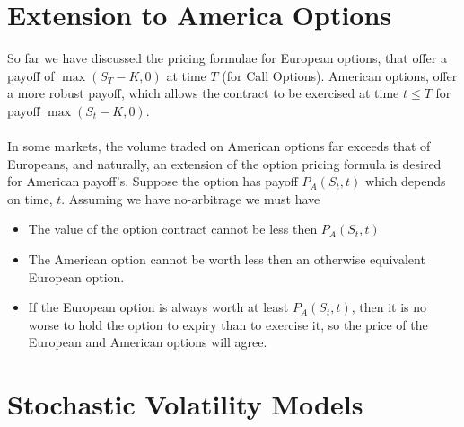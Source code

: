 \documentclass{article}
\begin{document}
\section{Extension to America Options}
So far we have discussed the pricing formulae for European options, that offer a payoff of $\max(S_T-K,0)$ at time $T$ (for Call Options). American options, offer a more robust payoff, which allows the contract to be exercised at time $t\leq T$ for payoff $\max(S_t-K,0)$. \\
\\
In some markets, the volume traded on American options far exceeds that of Europeans, and naturally, an extension of the option pricing formula is desired for American payoff's. Suppose the option has payoff $P_A (S_t, t)$ which depends on time, $t$. Assuming we have no-arbitrage we must have \begin{itemize}
    \item The value of the option contract cannot be less then $P_A(S_t, t)$
    \item The American option cannot be worth less then an otherwise equivalent European option. 
    \item If the European option is always worth at least $P_A(S_t, t)$, then it is no worse to hold the option to expiry than to exercise it, so the price of the European and American options will agree.
\end{itemize}

\newpage
\section{Stochastic Volatility Models}
\end{document}
